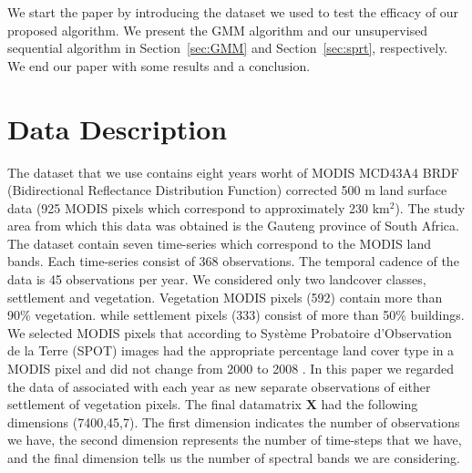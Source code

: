 \documentclass{article}
\begin{document}
We start the paper by introducing the dataset we used to test the efficacy of our proposed algorithm. We present the GMM algorithm and our unsupervised sequential algorithm in Section~\ref{sec:GMM} and 
Section~\ref{sec:sprt}, respectively. We end our paper with some results and a conclusion.
\section{Data Description}
\label{sec:data}
The dataset that we use contains eight years worht of MODIS MCD43A4 BRDF (Bidirectional Reflectance Distribution Function) corrected 500 m land surface
data (925 MODIS pixels which correspond to approximately 230 km$^2$). The study area from which this data was obtained is the Gauteng province of South Africa. The dataset contain seven time-series which correspond to the 
MODIS land bands. Each time-series consist of 368 observations. The temporal cadence of the data is 45 observations per year. We considered only two landcover classes, settlement and vegetation. 
Vegetation MODIS pixels (592) contain more than 90\% vegetation. while settlement pixels (333) consist of more than 50\% buildings. We selected MODIS pixels that according to Système Probatoire d’Observation de la Terre (SPOT) images had the appropriate percentage land cover type in a MODIS pixel and did not change from 2000 to 2008 \cite{grobler2012}.
In this paper we regarded the data of associated with each year as new separate observations of either settlement of vegetation pixels. The final datamatrix $\mathbf{X}$ had the following dimensions (7400,45,7). The first dimension
indicates the number of observations we have, the second dimension represents the number of time-steps that we have, and the final dimension tells us the number of 
spectral bands we are considering.
\end{document}
